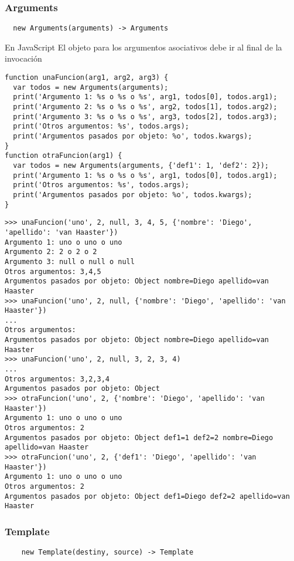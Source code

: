 \subsubsection*{Arguments}
\begin{verbatim}
  new Arguments(arguments) -> Arguments
\end{verbatim}
En JavaScript 
El objeto para los argumentos asociativos debe ir al final de la invocación
\begin{lstlisting}[style=javascript,label=objeto-arguments,caption=Uniformando argumentos]
function unaFuncion(arg1, arg2, arg3) { 
  var todos = new Arguments(arguments);
  print('Argumento 1: %s o %s o %s', arg1, todos[0], todos.arg1);
  print('Argumento 2: %s o %s o %s', arg2, todos[1], todos.arg2);
  print('Argumento 3: %s o %s o %s', arg3, todos[2], todos.arg3);
  print('Otros argumentos: %s', todos.args);
  print('Argumentos pasados por objeto: %o', todos.kwargs);
}
function otraFuncion(arg1) { 
  var todos = new Arguments(arguments, {'def1': 1, 'def2': 2});
  print('Argumento 1: %s o %s o %s', arg1, todos[0], todos.arg1);
  print('Otros argumentos: %s', todos.args);
  print('Argumentos pasados por objeto: %o', todos.kwargs);
}
\end{lstlisting}

\begin{lstlisting}[style=consola]
>>> unaFuncion('uno', 2, null, 3, 4, 5, {'nombre': 'Diego', 'apellido': 'van Haaster'})
Argumento 1: uno o uno o uno
Argumento 2: 2 o 2 o 2
Argumento 3: null o null o null
Otros argumentos: 3,4,5
Argumentos pasados por objeto: Object nombre=Diego apellido=van Haaster
>>> unaFuncion('uno', 2, null, {'nombre': 'Diego', 'apellido': 'van Haaster'})
...
Otros argumentos:
Argumentos pasados por objeto: Object nombre=Diego apellido=van Haaster
>>> unaFuncion('uno', 2, null, 3, 2, 3, 4)
...
Otros argumentos: 3,2,3,4
Argumentos pasados por objeto: Object
>>> otraFuncion('uno', 2, {'nombre': 'Diego', 'apellido': 'van Haaster'})
Argumento 1: uno o uno o uno
Otros argumentos: 2
Argumentos pasados por objeto: Object def1=1 def2=2 nombre=Diego apellido=van Haaster
>>> otraFuncion('uno', 2, {'def1': 'Diego', 'apellido': 'van Haaster'})
Argumento 1: uno o uno o uno
Otros argumentos: 2
Argumentos pasados por objeto: Object def1=Diego def2=2 apellido=van Haaster
\end{lstlisting}

\subsubsection*{Template}
\begin{verbatim}
    new Template(destiny, source) -> Template
\end{verbatim}

